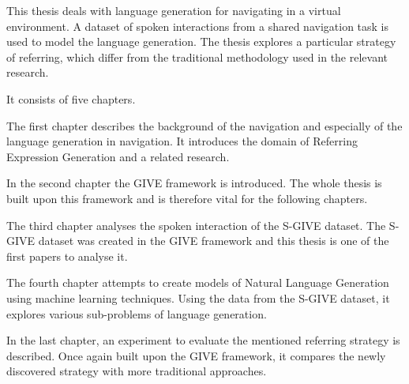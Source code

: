 This thesis deals with language generation for navigating in a virtual environment. A dataset of spoken interactions from a shared navigation task is used to model the language generation. The thesis explores a particular strategy of referring, which differ from the traditional methodology used in the relevant research. 

It consists of five chapters.

The first chapter describes the background of the navigation and especially of the language generation in navigation. It introduces the domain of Referring Expression Generation and a related research.

In the second chapter the GIVE framework is introduced. The whole thesis is built upon this framework and is therefore vital for the following chapters. 

The third chapter analyses the spoken interaction of the S-GIVE dataset. The S-GIVE dataset was created in the GIVE framework and this thesis is one of the first papers to analyse it.

The fourth chapter attempts to create models of Natural Language Generation using machine learning techniques. Using the data from the S-GIVE dataset, it explores various sub-problems of language generation.

In the last chapter, an experiment to evaluate the mentioned referring strategy is described. Once again built upon the GIVE framework, it compares the newly discovered strategy with more traditional approaches.   